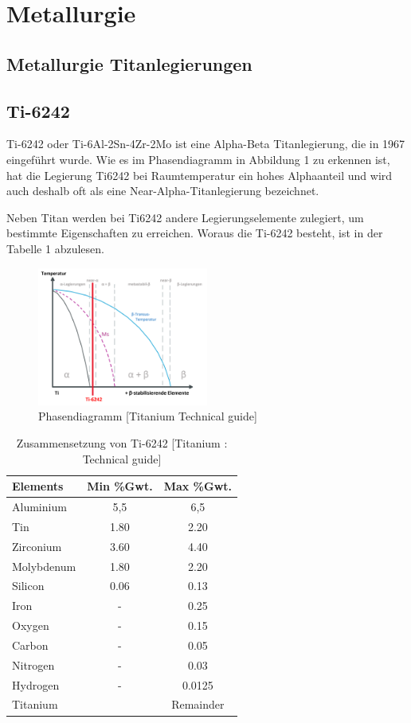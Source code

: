 \chapter{Metallurgie}	


\section{Metallurgie Titanlegierungen}
\section{Ti-6242}

Ti-6242 oder Ti-6Al-2Sn-4Zr-2Mo ist eine Alpha-Beta Titanlegierung, die  in 1967 eingeführt wurde.
Wie es im Phasendiagramm in Abbildung 1 zu erkennen ist, hat die Legierung Ti6242 bei Raumtemperatur ein hohes Alphaanteil und wird auch deshalb oft als eine Near-Alpha-Titanlegierung bezeichnet.

Neben Titan werden bei Ti6242 andere Legierungselemente zulegiert, um bestimmte Eigenschaften zu erreichen. Woraus die Ti-6242 besteht, ist in der Tabelle 1 abzulesen.


\begin{figure}[H]
	\centering
	\includegraphics[width=0.5\textwidth]{Bilder/Phasendiagram}
	\caption{Phasendiagramm [Titanium Technical guide]}
\end{figure}





\begin{table}[H]
	\centering	
	\begin{tabular}{|l |c |c|}
		\hline
		\centering
		\hspace{20ex}Elements \hspace{20ex} & Min \%Gwt. & Max \%Gwt.\\
		\hline
		Aluminium&5,5&6,5\\
		Tin&1.80&2.20\\
		Zirconium&3.60&4.40\\
		Molybdenum&1.80&2.20\\
		Silicon &0.06&0.13\\
		Iron&-&0.25\\
		Oxygen&-&0.15\\
		Carbon&	-&	0.05\\
		Nitrogen&-&0.03\\
		Hydrogen&-&0.0125\\
		
		Titanium &&Remainder\\
		\hline
	\end{tabular}
	\caption{Zusammensetzung von Ti-6242 [Titanium : Technical guide]}
\end{table}


